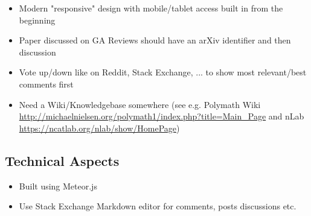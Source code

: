 \documentclass{amsart}
\begin{document}
\begin{itemize}
\item Modern "responsive" design with mobile/tablet access built in from the beginning
\item Paper discussed on GA Reviews should have an arXiv identifier and then discussion
\item Vote up/down like on Reddit, Stack Exchange, ... to show most relevant/best comments first
\item Need a Wiki/Knowledgebase somewhere (see e.g. Polymath Wiki \url{http://michaelnielsen.org/polymath1/index.php?title=Main_Page} and nLab \url{https://ncatlab.org/nlab/show/HomePage})
\end{itemize}

\subsection{Technical Aspects}
\label{subsec:webdesign_technical}

\begin{itemize}
\item Built using Meteor.js
\item Use Stack Exchange Markdown editor for comments, posts discussions etc.
\end{itemize}
\end{document}

